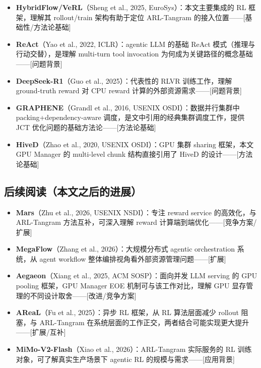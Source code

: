 \documentclass[11pt, a4paper]{article}
\begin{document}
\begin{itemize}
  \item \textbf{HybridFlow/VeRL}（Sheng et al., 2025, EuroSys）：本文主要集成的 RL 框架，理解其 rollout/train 架构有助于定位 ARL-Tangram 的接入位置——[基础性/方法论基础]

  \item \textbf{ReAct}（Yao et al., 2022, ICLR）：agentic LLM 的基础 ReAct 模式（推理与行动交替），是理解 multi-turn tool invocation 为何成为关键路径的概念基础——[问题背景]

  \item \textbf{DeepSeek-R1}（Guo et al., 2025）：代表性的 RLVR 训练工作，理解 ground-truth reward 对 CPU reward 计算的外部资源需求——[问题背景]

  \item \textbf{GRAPHENE}（Grandl et al., 2016, USENIX OSDI）：数据并行集群中 packing+dependency-aware 调度，是文中引用的经典集群调度工作，提供 JCT 优化问题的基础方法论——[方法论基础]

  \item \textbf{HiveD}（Zhao et al., 2020, USENIX OSDI）：GPU 集群 sharing 框架，本文 GPU Manager 的 multi-level chunk 结构直接引用了 HiveD 的设计——[方法论基础]
\end{itemize}

\subsection{后续阅读（本文之后的进展）}

\begin{itemize}
  \item \textbf{Mars}（Zhu et al., 2026, USENIX NSDI）：专注 reward service 的高效化，与 ARL-Tangram 方法互补，可深入理解 reward 计算端到端优化——[竞争方案/扩展]

  \item \textbf{MegaFlow}（Zhang et al., 2026）：大规模分布式 agentic orchestration 系统，从 agent workflow 整体编排视角看外部资源管理问题——[扩展]

  \item \textbf{Aegaeon}（Xiang et al., 2025, ACM SOSP）：面向并发 LLM serving 的 GPU pooling 框架，GPU Manager EOE 机制可与该工作对比，理解 GPU 显存管理的不同设计取舍——[改进/竞争方案]

  \item \textbf{AReaL}（Fu et al., 2025）：异步 RL 框架，从 RL 算法层面减少 rollout 阻塞，与 ARL-Tangram 在系统层面的工作正交，两者结合可能实现更大提升——[扩展/互补]

  \item \textbf{MiMo-V2-Flash}（Xiao et al., 2026）：ARL-Tangram 实际服务的 RL 训练对象，可了解真实生产场景下 agentic RL 的规模与需求——[应用背景]
\end{itemize}
\end{document}
